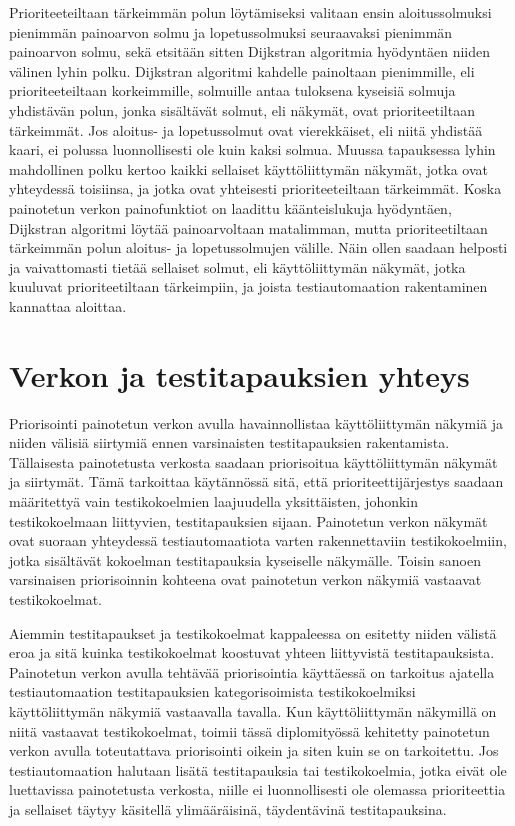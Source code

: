   Prioriteeteiltaan tärkeimmän polun löytämiseksi valitaan ensin aloitussolmuksi pienimmän painoarvon solmu ja lopetussolmuksi seuraavaksi pienimmän painoarvon solmu, sekä etsitään sitten Dijkstran algoritmia hyödyntäen niiden välinen lyhin polku.
  Dijkstran algoritmi kahdelle painoltaan pienimmille, eli prioriteeteiltaan korkeimmille, solmuille antaa tuloksena kyseisiä solmuja yhdistävän polun, jonka sisältävät solmut, eli näkymät, ovat prioriteetiltaan tärkeimmät.
  Jos aloitus- ja lopetussolmut ovat vierekkäiset, eli niitä yhdistää kaari, ei polussa luonnollisesti ole kuin kaksi solmua.
  Muussa tapauksessa lyhin mahdollinen polku kertoo kaikki sellaiset käyttöliittymän näkymät, jotka ovat yhteydessä toisiinsa, ja jotka ovat yhteisesti prioriteeteiltaan tärkeimmät.
  Koska painotetun verkon painofunktiot on laadittu käänteislukuja hyödyntäen, Dijkstran algoritmi löytää painoarvoltaan matalimman, mutta prioriteetiltaan tärkeimmän polun aloitus- ja lopetussolmujen välille.
  Näin ollen saadaan helposti ja vaivattomasti tietää sellaiset solmut, eli käyttöliittymän näkymät, jotka kuuluvat prioriteetiltaan tärkeimpiin, ja joista testiautomaation rakentaminen kannattaa aloittaa.

\section{Verkon ja testitapauksien yhteys} \label{ch:10_verkon_ja_testitapauksien_yhteys}

  Priorisointi painotetun verkon avulla havainnollistaa käyttöliittymän näkymiä ja niiden välisiä siirtymiä ennen varsinaisten testitapauksien rakentamista.
  Tällaisesta painotetusta verkosta saadaan priorisoitua käyttöliittymän näkymät ja siirtymät.
  Tämä tarkoittaa käytännössä sitä, että prioriteettijärjestys saadaan määritettyä vain testikokoelmien laajuudella yksittäisten, johonkin testikokoelmaan liittyvien, testitapauksien sijaan.
  Painotetun verkon näkymät ovat suoraan yhteydessä testiautomaatiota varten rakennettaviin testikokoelmiin, jotka sisältävät kokoelman testitapauksia kyseiselle näkymälle.
  Toisin sanoen varsinaisen priorisoinnin kohteena ovat painotetun verkon näkymiä vastaavat testikokoelmat.

  Aiemmin testitapaukset ja testikokoelmat kappaleessa on esitetty niiden välistä eroa ja sitä kuinka testikokoelmat koostuvat yhteen liittyvistä testitapauksista.
  Painotetun verkon avulla tehtävää priorisointia käyttäessä on tarkoitus ajatella testiautomaation testitapauksien kategorisoimista testikokoelmiksi käyttöliittymän näkymiä vastaavalla tavalla.
  Kun käyttöliittymän näkymillä on niitä vastaavat testikokoelmat, toimii tässä diplomityössä kehitetty painotetun verkon avulla toteutattava priorisointi oikein ja siten kuin se on tarkoitettu.
  Jos testiautomaation halutaan lisätä testitapauksia tai testikokoelmia, jotka eivät ole luettavissa painotetusta verkosta, niille ei luonnollisesti ole olemassa prioriteettia ja sellaiset täytyy käsitellä ylimääräisinä, täydentävinä testitapauksina.

